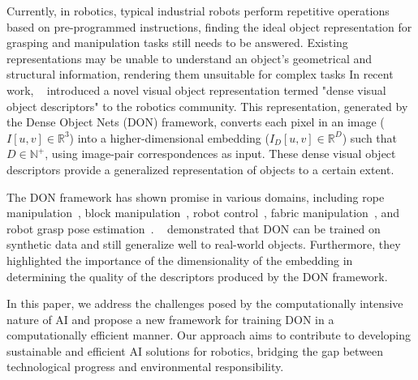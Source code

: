 Currently, in robotics, typical industrial robots perform repetitive operations based on pre-programmed instructions,
finding the ideal object representation for grasping and manipulation tasks still needs to be answered.
Existing representations may be unable to understand an object's geometrical and structural information, rendering them unsuitable for complex tasks
In recent work, \citeauthor{florence2018dense}~\cite{florence2018dense} introduced a novel visual object representation termed "dense visual object descriptors" to the robotics community.
This representation, generated by the Dense Object Nets (DON) framework, converts each pixel in an image ($I[u, v] \in \mathbb{R}^3$)
into a higher-dimensional embedding ($I_D[u, v] \in \mathbb{R}^D$) such that $D \in \mathbb{N}^+$,
using image-pair correspondences as input. These dense visual object descriptors provide a generalized representation of objects to a certain extent.


The DON framework has shown promise in various domains, including rope manipulation~\cite{rope-manipulation},
block manipulation~\cite{block-manipulation}, robot control~\cite{florence2019self}, fabric manipulation~\cite{fabric-manipulation},
and robot grasp pose estimation~\parencites{kupcsik2021supervised}{adrian2022efficient}. \citeauthor{adrian2022efficient}~\cite{adrian2022efficient}
demonstrated that DON can be trained on
synthetic data and still generalize well to real-world objects. Furthermore, they highlighted the importance of the
dimensionality of the embedding in determining the quality of the descriptors produced by the DON framework.


In this paper, we address the challenges posed by the computationally intensive nature of AI and propose a new framework for training DON in a computationally efficient manner.
Our approach aims to contribute to developing sustainable and efficient AI solutions for robotics, bridging the gap between technological progress and environmental responsibility.